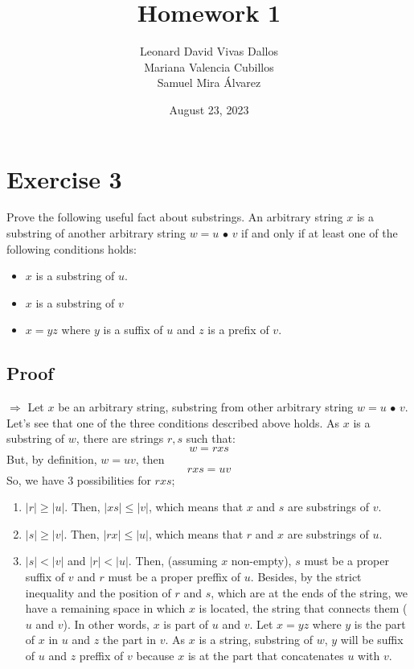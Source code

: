 \documentclass[12pt]{article}
\title{Homework 1}
\author{Leonard David Vivas Dallos \\ Mariana Valencia Cubillos \\ Samuel Mira Álvarez}
\date{August 23, 2023}
\begin{document}
\maketitle

\tableofcontents

\section{Exercise 3}
Prove the following useful fact about substrings. An arbitrary string $x$ is a substring of another arbitrary string $w = u \text{ • } v$ if and only if at least one of the following conditions holds:

\begin{itemize}
    \item $x$ is a substring of $u$.
    \item $x$ is a substring of $v$
    \item $x=yz$ where $y$ is a suffix of $u$ and $z$ is a prefix of $v$.
\end{itemize}

\subsection{Proof}
$\Rightarrow$
Let $x$ be an arbitrary string, substring from other arbitrary string $w = u \text{ • } v$. Let's see that one of the three conditions described above holds.
As $x$ is a substring of $w$, there are strings $r, s$ such that:
\begin{equation*}
    w=rxs
\end{equation*}
But, by definition, $w = uv$, then
\begin{equation*}
    rxs = uv
\end{equation*}
So, we have 3 possibilities for $rxs$;
\begin{enumerate}
    \item $|r| \geq |u|$. Then, $|xs| \leq |v|$, which means that $x$ and $s$ are substrings of $v$.
    \item $|s| \geq |v|$. Then, $|rx| \leq |u|$, which means that $r$ and $x$ are substrings of $u$.
    \item $|s| < |v|$ and $|r| < |u|$. Then, (assuming $x$ non-empty), $s$ must be a proper suffix of $v$ and $r$ must be a proper preffix of $u$. Besides, by the strict inequality and the position of $r$ and $s$, which are at the ends of the string, we have a remaining space in which $x$ is located, the string that connects them ($u$ and $v$). In other words, $x$ is part of $u$ and $v$. Let $x=yz$ where $y$ is the part of $x$ in $u$ and $z$ the part in $v$. As $x$ is a string, substring of $w$, $y$ will be suffix of $u$ and $z$ preffix of $v$ because $x$ is at the part that concatenates $u$ with $v$. 
\end{enumerate}
\end{document}
